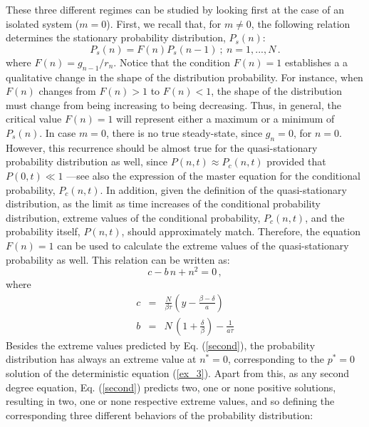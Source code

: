 These three different regimes can be studied by looking first at the case of an isolated system ($m=0$). First, we recall that, for $m \not= 0$, the following relation determines the stationary probability distribution, $P_s(n)$:
\begin{equation}
P_s(n) = F(n) P_s(n-1)\ ; \ n = 1,...,N\,. 
\label{balance_2}
\end{equation}  
where $F(n)=g_{n-1}/{r_n}$. Notice that the condition $F(n)=1$ establishes a a qualitative change in the shape of the distribution probability. For instance, when $F(n)$ changes from $F(n)>1$ to $F(n)<1$, the shape of the distribution must change from being increasing to being decreasing. Thus, in general, the critical value $F(n)=1$ will represent either a maximum or a minimum of $P_s(n)$. In case $m=0$, there is no true steady-state, since $g_n = 0$, for $n=0$. However, this recurrence should be almost true for the quasi-stationary probability distribution as well, since $P(n,t) \approx P_c(n,t)$ provided that $P(0,t) \ll 1$ ---see also the expression of the master equation for the conditional probability, $P_c(n,t)$. In addition, given the definition of the quasi-stationary distribution, as the limit as time increases of the conditional probability distribution, extreme values of the conditional probability, $P_c(n,t)$, and the probability itself, $P(n,t)$, should approximately match. Therefore, the equation $F(n)=1$ can be used to calculate the extreme values of the quasi-stationary probability as well. This relation can be written as: 
\begin{equation}
\label{second}
c - b\,n + n^2=0\,, 
\end{equation}
where
\begin{eqnarray}
\label{eq_c}
c & = & \frac{N}{\beta\tau}\left(y - \frac{\beta-\delta}{a}\right)\\
b & = & N\,\left(1+\frac{\delta}{\beta}\right)-\frac{1}{a\tau}
\label{eq_b}
\end{eqnarray}
Besides the extreme values predicted by Eq. (\ref{second}), the probability distribution has always an extreme value at $n^{*}=0$, corresponding to the $p^{*}=0$ solution of the deterministic equation (\ref{ex_3}). Apart from this, as any second degree equation, Eq. (\ref{second}) predicts two, one or none positive solutions, resulting in two, one or none respective extreme values, and so defining the corresponding three different behaviors of the probability distribution:
